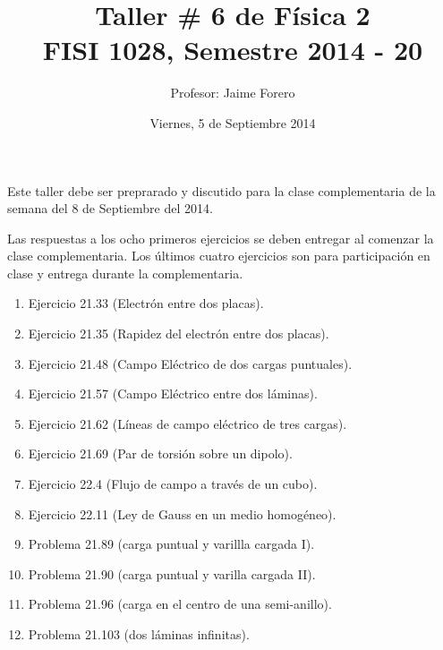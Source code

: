 \documentclass{article}
\title{Taller \# 6 de F\'isica 2\\ FISI 1028, Semestre 2014 - 20}
\author{Profesor: Jaime Forero}
\date{Viernes, 5 de Septiembre 2014}
\begin{document}
\maketitle
\thispagestyle{empty}

\noindent

Este taller debe ser preprarado y discutido para la clase
complementaria de la semana del 8 de Septiembre del 2014.

Las respuestas a los ocho primeros ejercicios se deben entregar al comenzar la
clase complementaria. Los \'ultimos cuatro ejercicios son para participaci\'on en clase y entrega durante la complementaria. 


\begin{enumerate}

\item
Ejercicio 21.33 (Electr\'on entre dos placas).

\item
Ejercicio 21.35 (Rapidez del electr\'on entre dos placas).

\item
Ejercicio 21.48 (Campo El\'ectrico de dos cargas puntuales).

\item
Ejercicio 21.57 (Campo El\'ectrico entre dos l\'aminas).

\item
Ejercicio 21.62 (L\'ineas de campo el\'ectrico de tres cargas).

\item 
Ejercicio 21.69 (Par de torsi\'on sobre un dipolo).

\item
Ejercicio 22.4 (Flujo de campo a trav\'es de un cubo).

\item 
Ejercicio 22.11 (Ley de Gauss en un medio homog\'eneo).

\item 
Problema 21.89 (carga puntual y varillla cargada I).

\item
Problema 21.90 (carga puntual y varilla cargada II).

\item 
Problema 21.96 (carga en el centro de una semi-anillo).

\item
Problema 21.103 (dos l\'aminas infinitas).
\end{enumerate}
\end{document}
